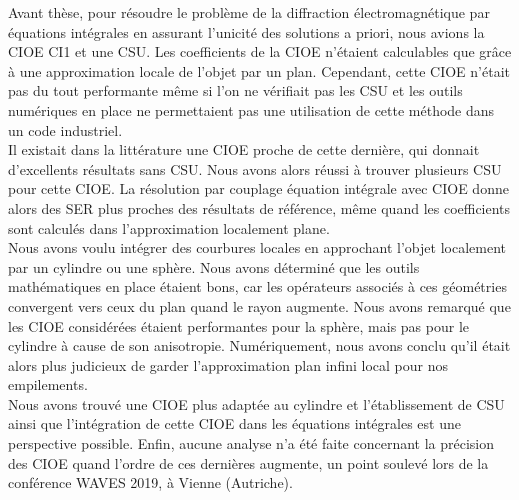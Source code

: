 
Avant thèse, pour résoudre le problème de la diffraction électromagnétique par équations intégrales en assurant l'unicité des solutions a priori, nous avions la CIOE CI1 et une CSU.
Les coefficients de la CIOE n'étaient calculables que grâce à une approximation locale de l'objet par un plan.
Cependant, cette CIOE n'était pas du tout performante même si l’on ne vérifiait pas les CSU et les outils numériques en place ne permettaient pas une utilisation de cette méthode dans un code industriel.
\\

Il existait dans la littérature une CIOE proche de cette dernière, qui donnait d'excellents résultats sans CSU.
Nous avons alors réussi à trouver plusieurs CSU pour cette CIOE.
La résolution par couplage équation intégrale avec CIOE donne alors des SER plus proches des résultats de référence, même quand les coefficients sont calculés dans l'approximation localement plane.
\\

Nous avons voulu intégrer des courbures locales en approchant l'objet localement par un cylindre ou une sphère.
Nous avons déterminé que les outils mathématiques en place étaient bons, car les opérateurs associés à ces géométries convergent vers ceux du plan quand le rayon augmente.
Nous avons remarqué que les CIOE considérées étaient performantes pour la sphère, mais pas pour le cylindre à cause de son anisotropie.
Numériquement, nous avons conclu qu'il était alors plus judicieux de garder l’approximation plan infini local pour nos empilements.
\\

Nous avons trouvé une CIOE plus adaptée au cylindre et l'établissement de CSU ainsi que l'intégration de cette CIOE dans les équations intégrales est une perspective possible.
Enfin, aucune analyse n'a été faite concernant la précision des CIOE quand l'ordre de ces dernières augmente, un point soulevé lors de la conférence WAVES 2019, à Vienne (Autriche).
